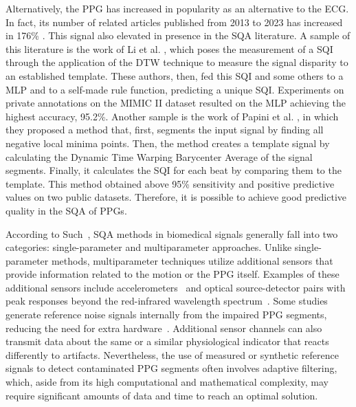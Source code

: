 Alternatively, the \gls{PPG} has increased in popularity as an alternative to the \gls{ECG}. In fact, its number of related articles published from 2013 to 2023 has increased in 176\% \cite{ppg-1}. This signal also elevated in presence in the \gls{SQA} literature. A sample of this literature is the work of Li et al. \cite{ppg-2}, which poses the measurement of a \gls{SQI} through the application of the \gls{DTW} technique to measure the signal disparity to an established template. These authors, then, fed this \gls{SQI} and some others to a \gls{MLP} and to a self-made rule function, predicting a unique \gls{SQI}. Experiments on private annotations on the MIMIC II dataset resulted on the \gls{MLP} achieving the highest accuracy, 95.2\%. Another sample is the work of Papini et al. \cite{ppg-3}, in which they proposed a method that, first, segments the input signal by finding all negative local minima points. Then, the method creates a template signal by calculating the Dynamic Time Warping Barycenter Average of the signal segments. Finally, it calculates the \gls{SQI} for each beat by comparing them to the template. This method obtained above 95\% sensitivity and positive predictive values on two public datasets. Therefore, it is possible to achieve good predictive quality in the \gls{SQA} of \glspl{PPG}.


According to Such~\cite{such2007motion}, \gls{SQA} methods in biomedical signals generally fall into two categories: single-parameter and multiparameter approaches. Unlike single-parameter methods, multiparameter techniques utilize additional sensors that provide information related to the motion or the \gls{PPG} itself. Examples of these additional sensors include accelerometers~\cite{nabavi2020robust, tuauctan2015characterization} and optical source-detector pairs with peak responses beyond the red-infrared wavelength spectrum~\cite{zhang2019motion}. Some studies generate reference noise signals internally from the impaired \gls{PPG} segments, reducing the need for extra hardware~\cite{ram2011novel, raghuram2016use}. Additional sensor channels can also transmit data about the same or a similar physiological indicator that reacts differently to artifacts. Nevertheless, the use of measured or synthetic reference signals to detect contaminated \gls{PPG} segments often involves adaptive filtering, which, aside from its high computational and mathematical complexity, may require significant amounts of data and time to reach an optimal solution.



